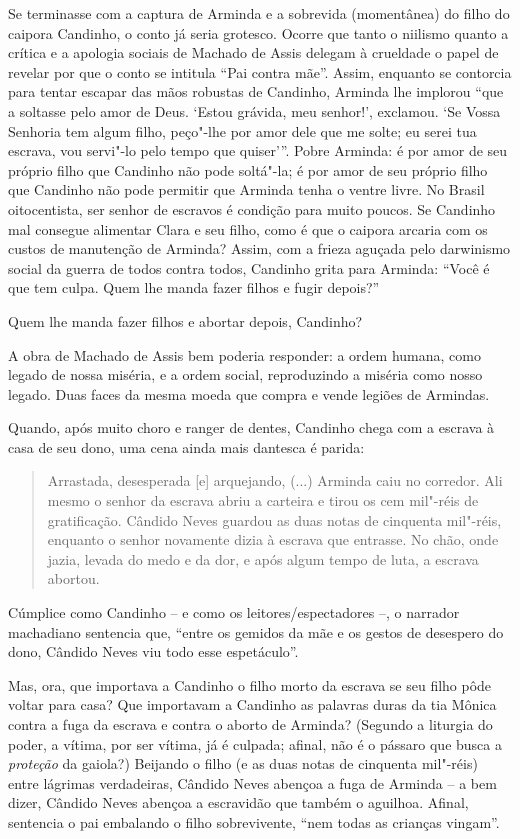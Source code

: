 Se terminasse com a captura de Arminda e a sobrevida (momentânea) do
filho do caipora Candinho, o conto já seria grotesco. Ocorre que tanto o
niilismo quanto a crítica e a apologia sociais de Machado de Assis
delegam à crueldade o papel de revelar por que o conto se intitula ``Pai
contra mãe''. Assim, enquanto se contorcia para tentar escapar das mãos
robustas de Candinho, Arminda lhe implorou ``que a soltasse pelo amor de
Deus. `Estou grávida, meu senhor!', exclamou. `Se Vossa Senhoria tem
algum filho, peço"-lhe por amor dele que me solte; eu serei tua escrava,
vou servi"-lo pelo tempo que quiser'''. Pobre Arminda: é por amor de seu
próprio filho que Candinho não pode soltá"-la; é por amor de seu próprio
filho que Candinho não pode permitir que Arminda tenha o ventre livre.
No Brasil oitocentista, ser senhor de escravos é condição para muito
poucos. Se Candinho mal consegue alimentar Clara e seu filho, como é que
o caipora arcaria com os custos de manutenção de Arminda? Assim, com a
frieza aguçada pelo darwinismo social da guerra de todos contra todos,
Candinho grita para Arminda: ``Você é que tem culpa. Quem lhe manda
fazer filhos e fugir depois?''

Quem lhe manda fazer filhos e abortar depois, Candinho?

A obra de Machado de Assis bem poderia responder: a ordem humana, como
legado de nossa miséria, e a ordem social, reproduzindo a miséria como
nosso legado. Duas faces da mesma moeda que compra e vende legiões de
Armindas.

Quando, após muito choro e ranger de dentes, Candinho chega com a
escrava à casa de seu dono, uma cena ainda mais dantesca é parida:

\begin{quote}
Arrastada, desesperada {[}e{]} arquejando, (...) Arminda caiu no
corredor. Ali mesmo o senhor da escrava abriu a carteira e tirou os cem
mil"-réis de gratificação. Cândido Neves guardou as duas notas de
cinquenta mil"-réis, enquanto o senhor novamente dizia à escrava que
entrasse. No chão, onde jazia, levada do medo e da dor, e após algum
tempo de luta, a escrava abortou.
\end{quote}

Cúmplice como Candinho -- e como os leitores/espectadores --, o narrador
machadiano sentencia que, ``entre os gemidos da mãe e os gestos de
desespero do dono, Cândido Neves viu todo esse espetáculo''.

Mas, ora, que importava a Candinho o filho morto da escrava se seu filho
pôde voltar para casa? Que importavam a Candinho as palavras duras da
tia Mônica contra a fuga da escrava e contra o aborto de Arminda?
(Segundo a liturgia do poder, a vítima, por ser vítima, já é culpada;
afinal, não é o pássaro que busca a \emph{proteção} da gaiola?) Beijando
o filho (e as duas notas de cinquenta mil"-réis) entre lágrimas
verdadeiras, Cândido Neves abençoa a fuga de Arminda -- a bem dizer,
Cândido Neves abençoa a escravidão que também o aguilhoa. Afinal,
sentencia o pai embalando o filho sobrevivente, ``nem todas as crianças
vingam''.


